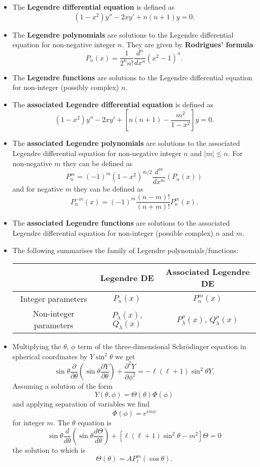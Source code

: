 \documentclass{article}
\begin{document}
\begin{itemize}
  \item The \textbf{Legendre differential equation} is defined as \[(1 - x^2) y'' - 2 x y' + n (n + 1) y = 0.\]

  \item The \textbf{Legendre polynomials} are solutions to the Legendre differential equation for non-negative integer $n$. They are given by \textbf{Rodrigues' formula} \[P_n(x) = \frac{1}{2^n n!} \frac{d^n}{d x^n} (x^2 - 1)^n.\]

  \item The \textbf{Legendre functions} are solutions to the Legendre differential equation for non-integer (possibly complex) $n$.

  \item The \textbf{associated Legendre differential equation} is defined as \[(1 - x^2) y'' - 2 x y' + \left[ n (n + 1) - \frac{m^2}{1 - x^2} \right] y = 0.\]

  \item The \textbf{associated Legendre polynomials} are solutions to the associated Legendre differential equation for non-negative integer $n$ and $|m| \le n$. For non-negative $m$ they can be defined as \[P_n^m = (-1)^m (1 - x^2)^{m / 2} \frac{d^m}{d x^m} (P_n(x))\] and for negative $m$ they can be defined as \[P_n^{-m}(x) = (-1)^m \frac{(n - m)!}{(n + m)!} P_n^m(x).\]

  \item The \textbf{associated Legendre functions} are solutions to the associated Legendre differential equation for non-integer (possible complex) $n$ and $m$.

  \item The following summarises the family of Legendre polynomials/functions:

  \begin{center}
    \begin{tabular}{ |c||c|c| }
      \hline
      & Legendre DE & Associated Legendre DE \\
      \hline \hline
      Integer parameters & $P_n(x)$ & $P_n^m(x)$ \\
      Non-integer parameters & $P_\lambda(x)$, $Q_\lambda(x)$ & $P_\lambda^\mu(x)$, $Q_\lambda^\mu(x)$ \\
      \hline
    \end{tabular}
  \end{center}

  \item Multiplying the $\theta$, $\phi$ term of the three-dimensional Schrödinger equation in spherical coordinates by $Y \sin^2 \theta$ we get \[\sin \theta \frac{\partial}{\partial \theta} \left( \sin \theta \frac{\partial Y}{\partial \theta} \right) + \frac{\partial^2 Y}{\partial \phi^2} = -\ell (\ell + 1) \sin^2 \theta Y.\] Assuming a solution of the form \[Y(\theta, \phi) = \Theta(\theta) \Phi(\phi)\] and applying separation of variables we find \[\Phi(\phi) = e^{i m \phi}\] for integer $m$. The $\theta$ equation is \[\sin \theta \frac{d}{d \theta} \left( \sin \theta \frac{d \Theta}{d \theta} \right) + [\ell (\ell + 1) \sin^2 \theta - m^2] \Theta = 0\] the solution to which is \[\Theta(\theta) = A P_\ell^m (\cos \theta).\]


\end{itemize}
\end{document}

